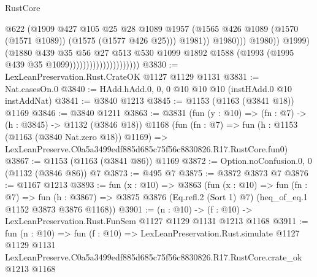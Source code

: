 \begin{lexlean}{RustCore}
\begin{coremodule}
                                                      @622
                                                      (@1909
                                                        @427
                                                        @105
                                                        @25
                                                        @28
                                                        @1089
                                                        @1957
                                                        (@1565
                                                          @426
                                                          @1089
                                                          (@1570 (@1571 @1089))
                                                          (@1575 (@1577 @426 @25)))
                                                        @1981))
                                                    @1980)))
                                              @1980))
                                          @1999)
                                        (@1880
                                          @439
                                          @35
                                          @56
                                          @27
                                          @513
                                          @530
                                          @1099
                                          @1892
                                          @1588
                                          (@1993 (@1995 @439 @35 @1099)))))))))))))))))))))
@3830 := LexLeanPreservation.Rust.CrateOK @1127 @1129 @1131
@3831 := Nat.casesOn.{0}
@3840 := HAdd.hAdd.{0, 0, 0} @10 @10 @10 (instHAdd.{0} @10 instAddNat)
@3841 := @3840 @1213
@3845 := @1153 (@1163 (@3841 @18)) @1169
@3846 := @3840 @1211
@3863 := @3831
    (fun (y : @10) => (fn : @7) -> (h : @3845) -> @1132 (@3846 @18))
    @1168
    (fun (fn : @7) =>
    fun (h : @1153 (@1163 (@3840 Nat.zero @18)) @1169) =>
    LexLeanPreserve.C0a5a3499edf885d685c75f56c8830826.R17.RustCore.fun0)
@3867 := @1153 (@1163 (@3841 @86)) @1169
@3872 := Option.noConfusion.{0, 0} (@1132 (@3846 @86)) @7
@3873 := @495 @7
@3875 := @3872 @3873 @7
@3876 := @1167 @1213
@3893 := fun (x : @10) =>
  @3863
    (fun (x : @10) =>
    fun (fn : @7) =>
    fun (h : @3867) =>
    @3875 @3876 (Eq.refl.{2} (Sort 1) @7) (heq_of_eq.{1} @1152 @3873 @3876 @1168))
@3901 := (n : @10) -> (f : @10) -> LexLeanPreservation.Rust.FunSem @1127 @1129 @1131 @1213 @1168
@3911 := fun (n : @10) =>
  fun (f : @10) =>
  LexLeanPreservation.Rust.simulate
    @1127
    @1129
    @1131
    LexLeanPreserve.C0a5a3499edf885d685c75f56c8830826.R17.RustCore.crate_ok
    @1213
    @1168
\end{coremodule}
\end{lexlean}
